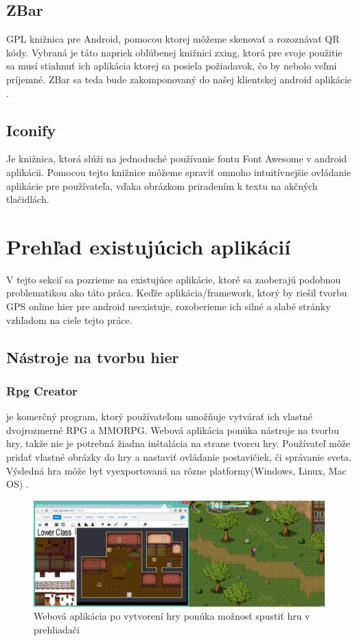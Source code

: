 \subsection{ZBar} GPL knižnica pre Android, pomocou ktorej môžeme skenovať a rozoznávať QR kódy. Vybraná je táto napriek obľúbenej knižnici zxing, ktorá pre svoje použitie sa musí stiahnuť ich aplikácia ktorej sa posiela požiadavok, čo by nebolo veľmi príjemné. ZBar sa teda bude zakomponovaný do našej klientskej android aplikácie \cite{qrreader}.

\subsection{Iconify}
Je knižnica, ktorá slúži na jednoduché používanie fontu Font Awesome v android aplikácii. Pomocou tejto knižnice môžeme spraviť omnoho intuitívnejšie ovládanie aplikácie pre používateľa, vďaka obrázkom priradením k textu na akčných tlačidlách.


\section{Prehľad existujúcich aplikácií}
V tejto sekcií sa pozrieme na existujúce aplikácie, ktoré sa zaoberajú podobnou problematikou ako táto práca. Keďže aplikácia/framework, ktorý by riešil tvorbu GPS online hier pre android neexistuje, rozoberieme ich silné a slabé stránky vzhľadom na ciele tejto práce. 

\subsection{Nástroje na tvorbu hier}

\subsubsection{Rpg Creator} je komerčný program, ktorý používateľom umožňuje vytvárať ich vlastné dvojrozmerné RPG a MMORPG. Webová aplikácia ponúka nástroje na tvorbu hry, takže nie je potrebná žiadna inštalácia na strane tvorcu hry. Používateľ môže pridať vlastné obrázky do hry a nastaviť ovládanie postavičiek, či správanie sveta. Výsledná hra môže byť vyexportovaná na rôzne platformy(Windows, Linux, Mac OS) \cite{rpgcreator}.

\begin{figure}
  \centering
  \includegraphics[width=14cm]{mainmatter/imgs/rpgcreator.png}
  \caption{Webová aplikácia po vytvorení hry ponúka možnosť spustiť hru v prehliadači}
  \label{fig:comenius}
\end{figure}


